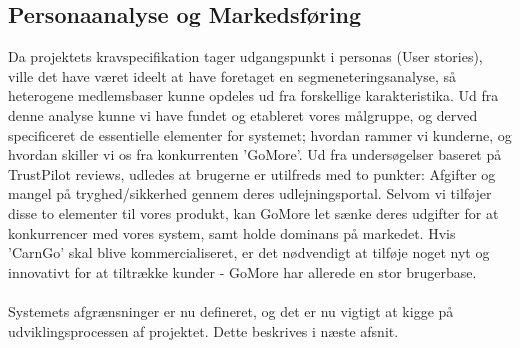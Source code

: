 \documentclass[a4paper,12pt,fleqn,oneside]{article}
\begin{document}
\subsection{Personaanalyse og Markedsføring}
Da projektets kravspecifikation tager udgangspunkt i personas (User stories), ville det have været ideelt at have foretaget en segmeneteringsanalyse, så heterogene medlemsbaser kunne opdeles ud fra forskellige karakteristika. Ud fra denne analyse kunne vi have fundet og etableret vores målgruppe, og derved specificeret de essentielle elementer for systemet; hvordan rammer vi kunderne, og hvordan skiller vi os fra konkurrenten 'GoMore'. Ud fra undersøgelser baseret på TrustPilot reviews, udledes at brugerne er utilfreds med to punkter: Afgifter og mangel på tryghed/sikkerhed gennem deres udlejningsportal. Selvom vi tilføjer disse to elementer til vores produkt, kan GoMore let sænke deres udgifter for at konkurrencer med vores system, samt holde dominans på markedet. Hvis 'CarnGo' skal blive kommercialiseret, er det nødvendigt at tilføje noget nyt og innovativt for at tiltrække kunder - GoMore har allerede en stor brugerbase. \\\\
Systemets afgrænsninger er nu defineret, og det er nu vigtigt at kigge på udviklingsprocessen af projektet. Dette beskrives i næste afsnit. 
\end{document}
